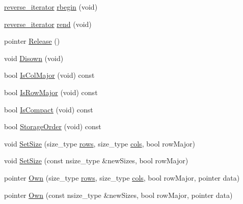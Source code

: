 \begin{DoxyCompactItemize}
\item 
\hyperlink{classvct_dynamic_matrix_owner_afa1149b71fe5f3151ee890e65ea7e81b}{reverse\-\_\-iterator} \hyperlink{classvct_dynamic_matrix_owner_a350a032e3a570318224c6f79b7b9f75e}{rbegin} (void)
\item 
\hyperlink{classvct_dynamic_matrix_owner_afa1149b71fe5f3151ee890e65ea7e81b}{reverse\-\_\-iterator} \hyperlink{classvct_dynamic_matrix_owner_aa12edc69a78d3c986faa1f95d993f870}{rend} (void)
\item 
pointer \hyperlink{classvct_dynamic_matrix_owner_ae6e16a07527b51f2da71dda44f723b93}{Release} ()
\item 
void \hyperlink{classvct_dynamic_matrix_owner_a22b66ff5225bf82493df7a1ae9aa7b1e}{Disown} (void)
\item 
bool \hyperlink{classvct_dynamic_matrix_owner_a0418023446b4f726018a01d96710a18a}{Is\-Col\-Major} (void) const 
\item 
bool \hyperlink{classvct_dynamic_matrix_owner_a79d5b06aa1235d52643fc8f4f1867aee}{Is\-Row\-Major} (void) const 
\item 
bool \hyperlink{classvct_dynamic_matrix_owner_a14868fc45649a9b6d91bdfe7f519026a}{Is\-Compact} (void) const 
\item 
bool \hyperlink{classvct_dynamic_matrix_owner_a46d599327bd4c1f8e195af6a252cb451}{Storage\-Order} (void) const 
\end{DoxyCompactItemize}
{\bf }\par
\begin{DoxyCompactItemize}
\item 
void \hyperlink{classvct_dynamic_matrix_owner_abbbe34fe0deff27167ba79860b887f1c}{Set\-Size} (size\-\_\-type \hyperlink{classvct_dynamic_matrix_owner_acbdac2c17cafa939c90536ab43a83ae6}{rows}, size\-\_\-type \hyperlink{classvct_dynamic_matrix_owner_a39b183ecd47dcfb5ca6957e390e39c4a}{cols}, bool row\-Major)
\item 
void \hyperlink{classvct_dynamic_matrix_owner_aab70106c23108e7c1f8b89c9d38e3734}{Set\-Size} (const nsize\-\_\-type \&new\-Sizes, bool row\-Major)
\end{DoxyCompactItemize}

{\bf }\par
\begin{DoxyCompactItemize}
\item 
pointer \hyperlink{classvct_dynamic_matrix_owner_a9e78e754f9739e1c9a8a987b62ab70bb}{Own} (size\-\_\-type \hyperlink{classvct_dynamic_matrix_owner_acbdac2c17cafa939c90536ab43a83ae6}{rows}, size\-\_\-type \hyperlink{classvct_dynamic_matrix_owner_a39b183ecd47dcfb5ca6957e390e39c4a}{cols}, bool row\-Major, pointer data)
\item 
pointer \hyperlink{classvct_dynamic_matrix_owner_ac3f65209b8d9b883eaf13afe2634364b}{Own} (const nsize\-\_\-type \&new\-Sizes, bool row\-Major, pointer data)
\end{DoxyCompactItemize}

